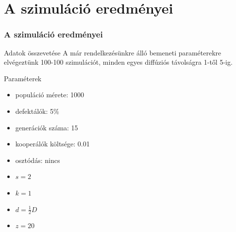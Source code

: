 \section{A szimuláció eredményei}
\begin{frame}
	\frametitle{A szimuláció eredményei}
	\begin{block}{Adatok összevetése}
		A már rendelkezésünkre álló bemeneti paraméterekre\cite{archetti2016cooperation} elvégeztünk 100-100 szimulációt, minden egyes diffúziós távolságra 1-től 5-ig.
	\end{block}

	\begin{block}{Paraméterek}
		\begin{multicols}{2}
			\begin{itemize}
				\item populáció mérete: 1000
				\item defektálók: 5\%
				\item generációk száma: 15
				\item kooperálók költsége: 0.01
				\item osztódás: nincs
			\end{itemize}
			\begin{itemize}
				\item $s = 2$
				\item $k = 1$
				\item $d = \frac{1}{2}D$
				\item $z = 20$
			\end{itemize}	
		\end{multicols}
	\end{block}
\end{frame}

